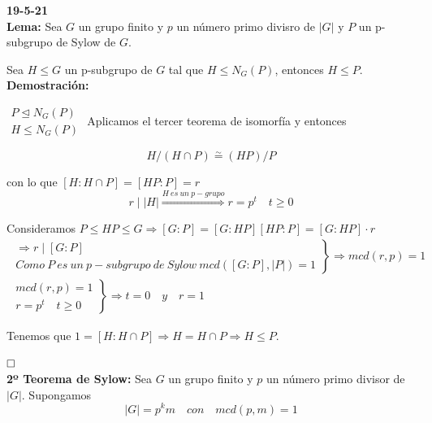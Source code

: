 \documentclass{article}
\begin{document}
\textbf{19-5-21} \\

\textbf{Lema:} Sea $G$ un grupo finito y $p$ un número primo divisro de $|G|$ y $P$ un p-subgrupo de Sylow de $G$.

Sea $H\leq G$ un p-subgrupo de $G$ tal que $H\leq N_G(P)$, entonces $H\leq P$. \\

\textbf{Demostración:}

$\left.\begin{array}{c}
P\unlhd N_G(P) \\
H\leq N_G(P)
\end{array} \right.$ Aplicamos el tercer teorema de isomorfía y entonces

\begin{equation*}
H/(H\cap P)\overset{\sim}{=} (HP)/P
\end{equation*}

con lo que $\left[H:H\cap P\right]=\left[HP:P\right]=r$
\begin{equation*}
r\mid |H|\overset{H\:es\:un\:p-grupo}{\Rightarrow} r=p^t\quad t\geq 0
\end{equation*}

Consideramos $P\leq HP\leq G\Rightarrow\left[G:P\right]=\left[G:HP\right]\left[HP:P\right]=\left[G:HP\right]\cdot r$
\begin{gather*}
\left.\begin{array}{c}
\Rightarrow r\mid \left[G:P\right] \\
Como\:P\:es\:un\:p-subgrupo\:de\:Sylow\:mcd(\left[G:P\right],|P|)=1
\end{array} \right\rbrace \Rightarrow mcd(r,p)=1 \\
\left. \begin{array}{c}
mcd(r,p)=1\\
r=p^t\quad t\geq 0
\end{array} \right\rbrace \Rightarrow t=0\quad y\quad r=1
\end{gather*}

Tenemos que $1=\left[H:H\cap P\right]\Rightarrow H=H\cap P\Rightarrow H\leq P$.

$\hfill\square$\\

\textbf{2º Teorema de Sylow:} Sea $G$ un grupo finito y $p$ un número primo divisor de $|G|$. Supongamos
\begin{equation*}
|G|=p^km\quad con \quad mcd(p,m)=1
\end{equation*}
\end{document}

